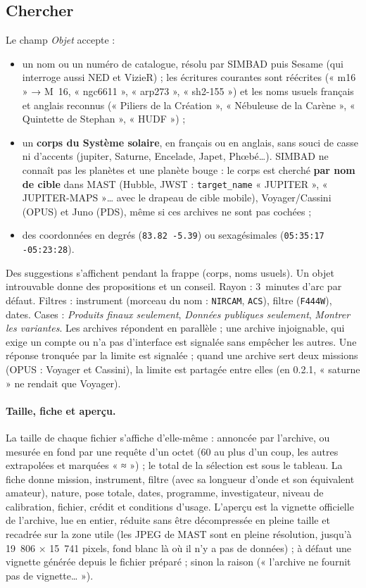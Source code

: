 \subsection{Chercher}
Le champ \emph{Objet} accepte :
\begin{itemize}
\item un nom ou un numéro de catalogue, résolu par SIMBAD puis Sesame (qui interroge aussi NED et VizieR) ; les
  écritures courantes sont réécrites (« m16 » → M~16, « ngc6611 », « arp273 », « sh2-155 ») et les noms usuels
  français et anglais reconnus (« Piliers de la Création », « Nébuleuse de la Carène », « Quintette de Stephan »,
  « HUDF ») ;
\item un \textbf{corps du Système solaire}, en français ou en anglais, sans souci de casse ni d'accents (jupiter,
  Saturne, Encelade, Japet, Phœbé…). SIMBAD ne connaît pas les planètes et une planète bouge : le corps est cherché
  \textbf{par nom de cible} dans MAST (Hubble, JWST : \texttt{target\_name} « JUPITER », « JUPITER-MAPS »… avec le
  drapeau de cible mobile), Voyager/Cassini (OPUS) et Juno (PDS), même si ces archives ne sont pas cochées ;
\item des coordonnées en degrés (\texttt{83.82 -5.39}) ou sexagésimales (\texttt{05:35:17 -05:23:28}).
\end{itemize}
Des suggestions s'affichent pendant la frappe (corps, noms usuels). Un objet introuvable donne des propositions et
un conseil. Rayon : 3~minutes d'arc par défaut. Filtres : instrument (morceau du nom : \texttt{NIRCAM},
\texttt{ACS}), filtre (\texttt{F444W}), dates. Cases : \emph{Produits finaux seulement}, \emph{Données publiques
seulement}, \emph{Montrer les variantes}. Les archives répondent en parallèle ; une archive injoignable, qui exige
un compte ou n'a pas d'interface est signalée sans empêcher les autres. Une réponse tronquée par la limite est
signalée ; quand une archive sert deux missions (OPUS : Voyager et Cassini), la limite est partagée entre elles (en
0.2.1, « saturne » ne rendait que Voyager).

\paragraph{Taille, fiche et aperçu.} La taille de chaque fichier s'affiche d'elle-même : annoncée par l'archive, ou
mesurée en fond par une requête d'un octet (60 au plus d'un coup, les autres extrapolées et marquées « ≈ ») ; le total
de la sélection est sous le tableau. La fiche donne mission, instrument, filtre (avec sa longueur d'onde et son
équivalent amateur), nature, pose totale, dates, programme, investigateur, niveau de calibration, fichier, crédit et
conditions d'usage. L'aperçu est la vignette officielle de l'archive, lue en entier, réduite sans être décompressée en
pleine taille et recadrée sur la zone utile (les JPEG de MAST sont en pleine résolution, jusqu'à 19~806 × 15~741
pixels, fond blanc là où il n'y a pas de données) ; à défaut une vignette générée depuis le fichier préparé ;
sinon la raison (« l'archive ne fournit pas de vignette… »).


